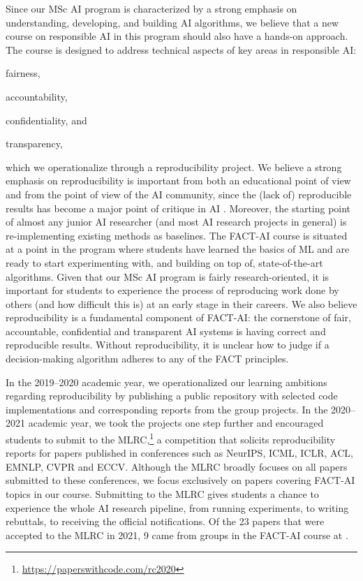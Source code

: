 Since our MSc AI program is characterized by a strong emphasis on understanding, developing, and building AI algorithms, we believe that a new course on responsible AI in this program should also have a hands-on approach.
The course is designed to address technical aspects of key areas in responsible AI:
\begin{enumerate*}[label=(\roman*)]
\item fairness, 
\item accountability, 
\item confidentiality, and 
\item transparency, 
\end{enumerate*}
which we operationalize through a reproducibility project. 
We believe a strong emphasis on reproducibility is important from both an educational point of view and from the point of view of the AI community, since the (lack of) reproducible results has become a major point of critique in \ac{AI} \cite{hutson2018artificial}. 
Moreover, the starting point of almost any junior AI researcher (and most AI research projects in general) is re-implementing existing methods as baselines. 
The FACT-AI course is situated at a point in the program where students have learned the basics of ML and are ready to start experimenting with, and building on top of, state-of-the-art algorithms. 
Given that our MSc AI program is fairly research-oriented, it is important for students to experience the process of reproducing work done by others (and how difficult this is) at an early stage in their careers. 
We also believe reproducibility is a fundamental component of FACT-AI: the cornerstone of fair, accountable, confidential and transparent \ac{AI} systems is having correct and reproducible results. 
Without reproducibility, it is unclear how to judge if a decision-making algorithm adheres to any of the FACT principles. 

In the 2019--2020 academic year, we operationalized our learning ambitions regarding reproducibility by publishing a public repository with selected code implementations and corresponding reports from the group projects.
In the 2020--2021 academic year, we took the projects one step further and encouraged students to submit to the \ac{MLRC},\footnote{\url{https://paperswithcode.com/rc2020}} a competition that solicits reproducibility reports for papers published in conferences such as NeurIPS, ICML, ICLR, ACL, EMNLP, CVPR and ECCV. 
Although the MLRC broadly focuses on all papers submitted to these conferences, we focus exclusively on papers covering FACT-AI topics in our course. 
Submitting to the MLRC gives students a chance to experience the whole AI research pipeline, from running experiments, to writing rebuttals, to receiving the official notifications. 
Of the 23 papers that were accepted to the MLRC in 2021, 9 came from groups in the FACT-AI course at \OurUniversity{}. 

